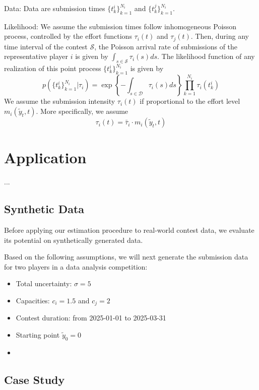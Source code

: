 \documentclass[a4paper, 11pt]{article}
\theoremstyle{plain} %
\begin{document}
Data: 
Data are submission times $\{t^i_k\}_{k=1}^{N_i}$ and $\{t^j_k\}_{k=1}^{N_i}$. 

Likelihood:
We assume the submission times follow inhomogeneous Poisson process, controlled by the effort functions $\tau_i(t)$ and $\tau_j(t)$. 
Then, during any time interval of the contest $\mathcal{S}$, the Poisson arrival rate of submissions of the representative player $i$ is given by $\int_{s\in\mathcal{S}}\tau_i(s)ds$. 
The likelihood function of any realization of this point process $\{t^i_k\}_{k=1}^{N_i}$ is given by 
\begin{equation*}
p\left(\{t^i_k\}_{k=1}^{N_i} | \tau_i\right) = \exp\left\{-\int_{s\in\mathcal{D}}\tau_i(s)ds\right\}\prod_{k=1}^{N_i}\tau_i(t^i_k)
\end{equation*}
We assume the submission intensity $\tau_i(t)$ if proportional to the effort level $m_i(\tilde{y}_t, t)$. 
More specifically, we assume 
$$
\tau_i(t) = \bar{\tau}_i \cdot m_i(\tilde{y}_t, t)
$$




\section{Application}

...

\subsection{Synthetic Data}

Before applying our estimation procedure to real-world contest data, we evaluate its potential on synthetically generated data.

Based on the following assumptions, we will next generate the submission data for two players in a data analysis competition: 
\begin{itemize}
	\item Total uncertainty: $\sigma = 5$
	\item Capacities: $c_i = 1.5$ and $c_j = 2$
	\item Contest duration: from 2025-01-01 to 2025-03-31
	\item Starting point $\tilde{y}_0=0$
	\item 
\end{itemize}



\subsection{Case Study}
\end{document}
